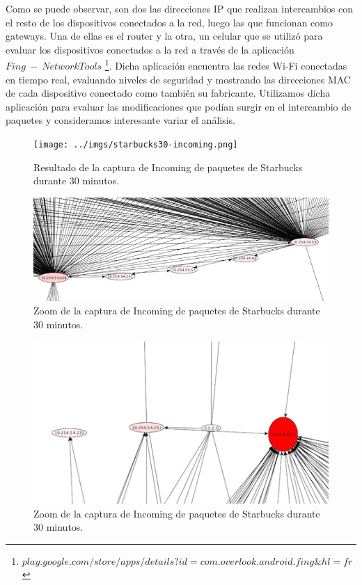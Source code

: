 \documentclass[10pt, a4paper]{article}
\begin{document}
Como se puede observar, son dos las direcciones IP que realizan intercambios con el resto de los dispositivos conectados a la red, luego las que funcionan como gateways. Una de ellas es el router y la otra, un celular que se utilizó para evaluar los dispositivos conectados a la red a través de la aplicación $Fing\ -\ Network Tools$ \footnote{$play.google.com/store/apps/details?id=com.overlook.android.fing\&hl=fr$}. Dicha aplicación encuentra las redes Wi-Fi conectadas en tiempo real, evaluando niveles de seguridad y mostrando las direcciones MAC de cada dispositivo conectado como también su fabricante. Utilizamos dicha aplicación para evaluar las modificaciones que podían surgir en el intercambio de paquetes y consideramos interesante variar el análisis.

\begin{figure}[H] %
\begin{center}
\texttt{[image: ../imgs/starbucks30-incoming.png]}
\caption{Resultado de la captura de Incoming de paquetes de Starbucks durante 30 minutos.}
\end{center}
\end{figure}

\begin{figure}[H] %
\begin{center}
\includegraphics[width=450pt]{../imgs/zoom-starbucks-incoming.png}
\caption{Zoom de la captura de Incoming de paquetes de Starbucks durante 30 minutos.}
\end{center}
\end{figure}

\begin{figure}[H] %
\begin{center}
\includegraphics[width=450pt]{../imgs/zoom-starbucks-incoming2.png}
\caption{Zoom de la captura de Incoming de paquetes de Starbucks durante 30 minutos.}
\end{center}
\end{figure}
\end{document}
